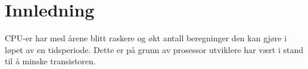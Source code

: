 \begin{titlepage}
	
	
	
	
	 
	
	\vfill %
	
\end{titlepage}
\newpage
\tableofcontents
\newpage

\section{Innledning}
CPU-er har med årene blitt raskere og økt antall beregninger den kan gjøre i løpet av en tidsperiode. Dette er på grunn av prosessor utviklere har vært i stand til å minske transistoren.


